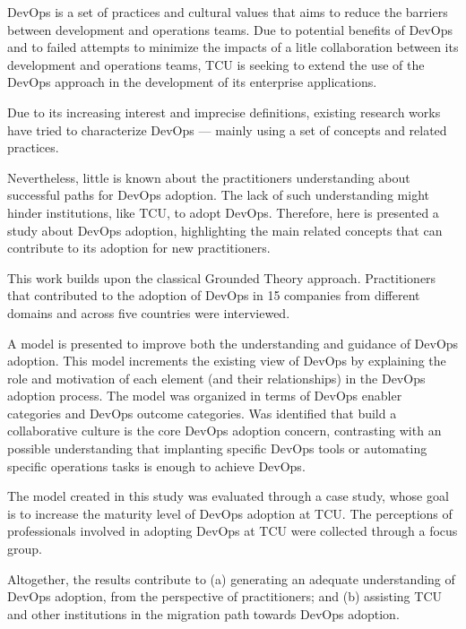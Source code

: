 DevOps is a set of practices and cultural values that aims to reduce the
barriers between development and operations teams. Due to potential benefits
of DevOps and to failed attempts to minimize the impacts of a litle
collaboration between its development and operations teams, \acrshort{TCU} is
seeking to extend the use of the DevOps approach in the development of its
enterprise applications.

Due to its increasing interest and imprecise definitions, existing research
works have tried to characterize DevOps — mainly using a set of concepts and
related practices.

Nevertheless, little is known about the practitioners understanding about
successful paths for DevOps adoption. The lack of such understanding might
hinder institutions, like \acrshort{TCU}, to adopt DevOps. Therefore, here is
presented a study about DevOps adoption, highlighting the main related concepts
that can contribute to its adoption for new practitioners.

This work builds upon the classical Grounded Theory approach. Practitioners that
contributed to the adoption of DevOps in 15 companies from different domains
and across five countries were interviewed.

A model is presented to improve both the understanding and guidance of
DevOps adoption. This model increments the existing view of DevOps by explaining
the role and motivation of each element (and their relationships) in the
DevOps adoption process. The model was organized in terms of DevOps enabler
categories and DevOps outcome categories. Was identified that build a
collaborative culture is the core DevOps adoption concern, contrasting with
an possible understanding that implanting specific DevOps tools or automating
specific operations tasks is enough to achieve DevOps.

The model created in this study was evaluated through a case study, whose goal
is to increase the maturity level of DevOps adoption at \acrshort{TCU}. The
perceptions of professionals involved in adopting DevOps at TCU were collected
through a focus group.

Altogether, the results contribute to (a) generating an adequate understanding
of DevOps adoption, from the perspective of practitioners; and (b) assisting
\acrshort{TCU} and other institutions in the migration path towards DevOps
adoption.
